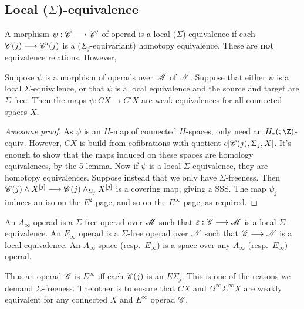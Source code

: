 \documentclass[11pt]{article}
\begin{document}
\subsection{Local (\texorpdfstring{$\Sigma$}{Sigma})-equivalence}
A morphism $\psi:\mathscr{C}\longrightarrow\mathscr{C}'$ of operad is a local ($\Sigma$)-equivalence if
each $\mathscr{C}(j)\longrightarrow\mathscr{C}'(j)$ is a ($\Sigma_j$-equivariant) homotopy equivalence.
These are \textbf{not} equivalence relations. However,
\begin{prop*}
Suppose $\psi$ is a morphism of operads over $\mathscr{M}$ of $\mathscr{N}$. Suppose that
either $\psi$ is a local $\Sigma$-equivalence, or that $\psi$ is a local
equivalence and the source and target are $\Sigma$-free. Then the maps
$\psi:CX\to C'X$ are weak equivalences for all connected spaces $X$.
\end{prop*}
\begin{proof}[Awesome proof]
As $\psi$ is an $H$-map of connected $H$-spaces, only need an $H_*(;\Z)$-equiv.
However, $CX$ is build from cofibrations with quotient $e[\mathscr{C}(j),\Sigma_j,X]$.
It's enough to show that the maps induced on these spaces are homology
equivalences, by the 5-lemma. Now if $\psi$ is a local $\Sigma$-equivalence, 
they are homotopy equivalences. Suppose instead that we only have $\Sigma$-freeness.
Then $\mathscr{C}(j)\wedge X^{[j]}\longrightarrow\mathscr{C}(j)\wedge_{\Sigma_j} X^{[j]}$ is a covering
map, giving a SSS. The map $\psi_j$ induces an iso on the $E^2$ page, and so
on the $E^\infty$ page, as required.
\end{proof}
\begin{defn*}[3.5]
An $A_\infty$ operad is a $\Sigma$-free operad over $\mathscr{M}$ such that
$\varepsilon:\mathscr{C}\longrightarrow\mathscr{M}$ is a local $\Sigma$-equivalence.
An $E_\infty$ operad is a $\Sigma$-free operad over $\mathscr{N}$ such that 
$\mathscr{C}\longrightarrow\mathscr{N}$ is a local equivalence.
 An $A_\infty$-space 
(resp.\ $E_\infty$) is a space over any $A_\infty$ (resp.\ $E_\infty$) operad.
\end{defn*}
Thus an operad $\mathscr{C}$ is $E^\infty$ iff each $\mathscr{C}(j)$ is an $E\Sigma_j$. 
This is one of the reasons we demand $\Sigma$-freeness. The other is to ensure
that $CX$ and $\Omega^\infty\Sigma^\infty X$ are weakly equivalent for any
connected $X$ and $E^\infty$ operad $\mathscr{C}$.
\end{document}
